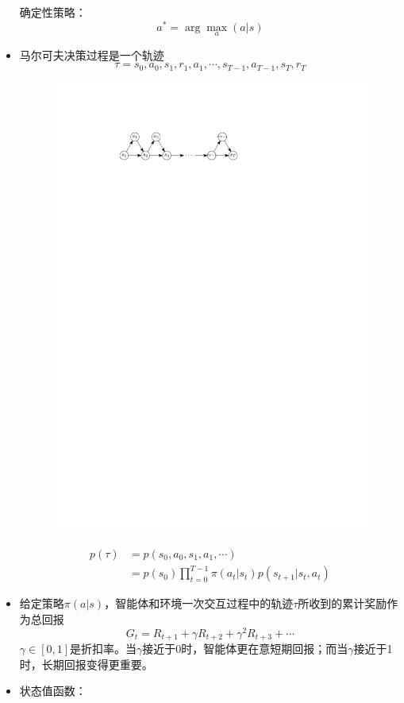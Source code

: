 \begin{note}
\begin{itemize}
        确定性策略：
        \[
            a^{*} = \arg\max\limits_{a}\left( a|s \right)  
        \]
        \item 马尔可夫决策过程是一个轨迹
        \[
            \tau = s_0,a_0,s_1,r_1,a_1,\cdots,s_{T-1},a_{T-1},s_{T},r_{T}
        \]
        \begin{figure}[htbp]
            \centering
            \includegraphics{image/马尔可夫决策过程.pdf}
        \end{figure}
        \[
            \begin{array}{ll}
                p(\tau) &= p(s_0,a_0,s_1,a_1,\cdots) \\
                &=p(s_0)\prod\limits_{t = 0}^{T-1}\pi(a_t|s_t)p\left( s_{t+1}|s_t,a_t \right) 
            \end{array}
        \]
        \item 给定策略$\pi\left( a|s \right)$，智能体和环境一次交互过程中的轨迹$\tau$所收到的累计奖励作为总回报
        \[
            G_t = R_{t+1}+\gamma R_{t+2}+\gamma^2R_{t+3}+\cdots
        \]
        $\gamma\in[0,1]$是折扣率。当$\gamma$接近于0时，智能体更在意短期回报；而当$\gamma$接近于1 时，长期回报变得更重要。
        \item 状态值函数：
        

\end{itemize}
\end{note}
